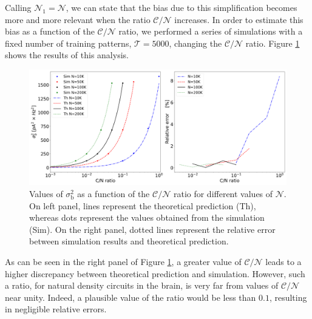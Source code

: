 \documentclass[a4paper, 12pt, twoside, openright]{book}
\newcommand{\NI}{\mathcal{N}_1}
\newcommand{\T}{\mathcal{T}}
\newcommand{\varSb}{\sigma^{2}_\text{b}}
\begin{document}
Calling $\NI=\mathcal{N}$, we can state that the bias due to this simplification becomes more and more relevant when the ratio $\mathcal{C}/\mathcal{N}$ increases.
In order to estimate this bias as a function of the $\mathcal{C}/\mathcal{N}$ ratio,
we performed a series of simulations with a fixed
number of training patterns, $\T=5000$, changing the $\mathcal{C}/\mathcal{N}$ ratio.
Figure \ref{fig:c_n_comparison} shows the results of this analysis.

\begin{figure}[t]
    \centering
	\includegraphics[width=\columnwidth]{figures/cn_plot.png}
	\caption{ 
    Values of $\varSb$ as a function of the $\mathcal{C}/\mathcal{N}$ ratio for different values of $\mathcal{N}$. On left panel, lines represent the theoretical prediction (Th), whereas dots represent the values obtained from the simulation (Sim). On the right panel, dotted lines represent the relative error between simulation results and theoretical prediction.
	\label{fig:c_n_comparison}}
\end{figure}

As can be seen in the right panel of Figure \ref{fig:c_n_comparison}, a greater value of $\mathcal{C}/\mathcal{N}$ leads to a higher discrepancy between theoretical prediction and simulation. However, such a ratio, for natural density circuits in the brain, is very far from values of $\mathcal{C}/\mathcal{N}$ near unity. Indeed, a plausible value of the ratio would be less than $0.1$, resulting in negligible relative errors.
\end{document}
